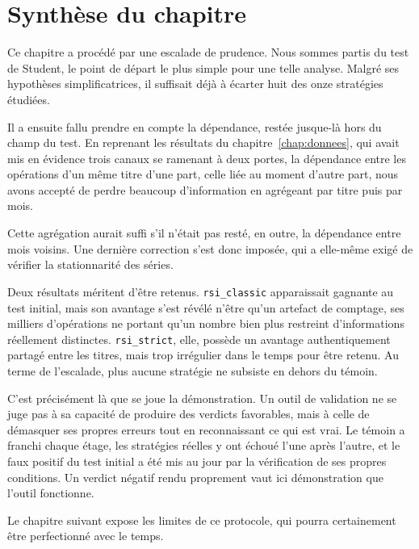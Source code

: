 \section{Synthèse du chapitre}
\label{sec:b1-synthese}
Ce chapitre a procédé par une escalade de prudence. Nous sommes partis du test
de Student, le point de départ le plus simple pour une telle analyse. Malgré
ses hypothèses simplificatrices, il suffisait déjà à écarter huit des onze
stratégies étudiées.

Il a ensuite fallu prendre en compte la dépendance, restée jusque-là hors du
champ du test. En reprenant les résultats du chapitre~\ref{chap:donnees}, qui
avait mis en évidence trois canaux se ramenant à deux portes, la dépendance
entre les opérations d'un même titre d'une part, celle liée au moment d'autre
part, nous avons accepté de perdre beaucoup d'information en agrégeant par
titre puis par mois.

Cette agrégation aurait suffi s'il n'était pas resté, en outre, la dépendance
entre mois voisins. Une dernière correction s'est donc imposée, qui a
elle-même exigé de vérifier la stationnarité des séries.

Deux résultats méritent d'être retenus. \texttt{rsi\_classic} apparaissait
gagnante au test initial, mais son avantage s'est révélé n'être qu'un artefact
de comptage, ses milliers d'opérations ne portant qu'un nombre bien plus
restreint d'informations réellement distinctes. \texttt{rsi\_strict}, elle,
possède un avantage authentiquement partagé entre les titres, mais trop
irrégulier dans le temps pour être retenu. Au terme de l'escalade, plus aucune
stratégie ne subsiste en dehors du témoin.

C'est précisément là que se joue la démonstration. Un outil de validation ne
se juge pas à sa capacité de produire des verdicts favorables, mais à celle de
démasquer ses propres erreurs tout en reconnaissant ce qui est vrai. Le témoin
a franchi chaque étage, les stratégies réelles y ont échoué l'une après
l'autre, et le faux positif du test initial a été mis au jour par la
vérification de ses propres conditions. Un verdict négatif rendu proprement
vaut ici démonstration que l'outil fonctionne.

Le chapitre suivant expose les limites de ce protocole, qui pourra
certainement être perfectionné avec le temps.